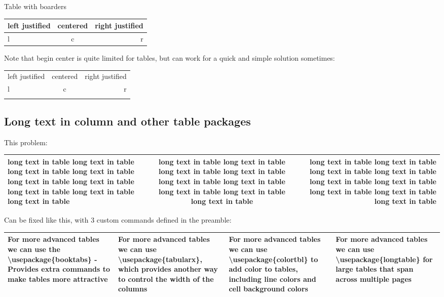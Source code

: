 \documentclass[12pt]{article}
\begin{document}
\noindent Table with boarders \\

\noindent
\begin{tabular}{ | l |c r| }
    \hline
    left justified & centered & right justified \\
    \hline
    l & c & r \\
    \hline
\end{tabular}

\noindent Note that begin center is quite limited for tables, but can work for a quick and simple solution sometimes: \\
\begin{center}
    \begin{tabular}{ | l |c r| }
        \hhline{ | - | - | - | }
        left justified & centered & right justified \\
        \hhline{ | - | ~ - | }
        l & c & r \\
        \hhline{ | - | ~ - | }
    \end{tabular}
\end{center}

\subsection{Long text in column and other table packages}

This problem: \\
\begin{tabular}{ | l | c | r | }
    \hline
    long text in table long text in table long text in table long text in table long text in table long text in table long text in table long text in table long text in table &
    long text in table long text in table long text in table long text in table long text in table long text in table long text in table long text in table long text in table &
    long text in table long text in table long text in table long text in table long text in table long text in table long text in table long text in table long text in table
    \\
    \hline
\end{tabular}

\noindent Can be fixed like this, with 3 custom commands defined in the preamble:

\begin{tabular}{ | L{5cm} | C{4cm} | R{3cm} | L{4cm} | }
    \hline
    For more advanced tables we can use the \textbf{\textbackslash usepackage\{booktabs\}} - Provides extra commands to make tables more attractive &
    For more advanced tables we can use \textbf{\textbackslash usepackage\{tabularx\}}, which provides another way to control the width of the columns &
    For more advanced tables we can use \textbf{\textbackslash usepackage\{colortbl\}} to add color to tables, including line colors and cell background colors &
    For more advanced tables we can use \textbf{\textbackslash usepackage\{longtable\}} for large tables that span across multiple pages
    \\
    \hline
\end{tabular}

\newpage
\printbibliography
\end{document}
